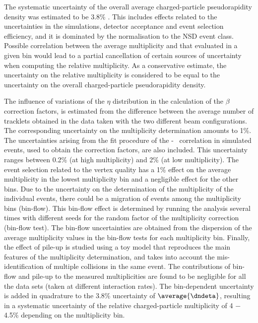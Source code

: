 
The systematic uncertainty of the overall average charged-particle pseudorapidity density was estimated to be 3.8\% \cite{Abelev:2013ab}. This includes effects related to the uncertainties in the simulations, detector acceptance and event selection efficiency, and it is dominated by the normalisation to the NSD event class. 
Possible correlation between the average multiplicity and that evaluated in a given bin would lead to a partial cancellation of certain sources of uncertainty when computing the relative multiplicity. As a conservative estimate, the uncertainty on the relative multiplicity is considered to be equal to the uncertainty on the overall charged-particle pseudorapidity density.

The influence of variations of the $\eta$ distribution in the calculation of the $\beta$ correction factors, is estimated from the difference between the average number of tracklets obtained in the data taken with the two different beam configurations. 
The corresponding uncertainty on the multiplicity determination amounts to 1\%. The uncertainties arising from the fit procedure of the \ntrcorr - \nch ~correlation in simulated events, used to obtain the correction factors, are also included. This uncertainty ranges between 0.2\% (at high multiplicity) and 2\% (at low multiplicity). The event selection related to the vertex quality has a 1\% effect on the average multiplicity in the lowest multiplicity bin and a negligible effect for the other bins. Due to the uncertainty on the determination of the multiplicity of the individual events, there could be a migration of events among the multiplicity bins (bin-flow). This bin-flow effect is determined by running the analysis several times with different seeds for the random factor of the multiplicity correction (bin-flow test). The bin-flow uncertainties are obtained from the dispersion of the average multiplicity values in the bin-flow tests for each multiplicity bin. Finally, the effect of pile-up is studied using a toy model that reproduces the main features of the multiplicity determination, and takes into account the mis-identification of multiple collisions in the same event. The contributions of bin-flow and pile-up to the measured multiplicities are found to be negligible for all the data sets (taken at different interaction rates). 
The bin-dependent uncertainty is added in quadrature to the 3.8\% uncertainty of  $\average{\dndeta}$, resulting in a systematic uncertainty of the relative charged-particle multiplicity of 4 $-$ 4.5\% depending on the multiplicity bin.


